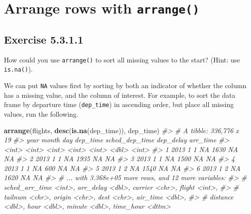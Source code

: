 \documentclass[]{book}
\newenvironment{Shaded}{\begin{snugshade}}{\end{snugshade}}
\newcommand{\CommentTok}[1]{\textcolor[rgb]{0.56,0.35,0.01}{\textit{#1}}}
\newcommand{\KeywordTok}[1]{\textcolor[rgb]{0.13,0.29,0.53}{\textbf{#1}}}
\newcommand{\NormalTok}[1]{#1}
\theoremstyle{plain}
\theoremstyle{remark}
\begin{document}
\hypertarget{arrange-rows-with-arrange}{%
\section{\texorpdfstring{Arrange rows with \texttt{arrange()}}{Arrange rows with arrange()}}\label{arrange-rows-with-arrange}}

\hypertarget{exercise-5.3.1.1}{%
\subsection*{\texorpdfstring{Exercise {5.3.1.1}}{Exercise 5.3.1.1}}\label{exercise-5.3.1.1}}

How could you use \texttt{arrange()} to sort all missing values to the start? (Hint: use \texttt{is.na()}).

We can put \texttt{NA} values first by sorting by both an indicator of whether the column has a missing value, and the column of interest.
For example, to sort the data frame by departure time (\texttt{dep\_time}) in ascending order, but place all missing values, run the following.

\begin{Shaded}
\begin{Highlighting}[]
\KeywordTok{arrange}\NormalTok{(flights, }\KeywordTok{desc}\NormalTok{(}\KeywordTok{is.na}\NormalTok{(dep_time)), dep_time)}
\CommentTok{#> # A tibble: 336,776 x 19}
\CommentTok{#>    year month   day dep_time sched_dep_time dep_delay arr_time}
\CommentTok{#>   <int> <int> <int>    <int>          <int>     <dbl>    <int>}
\CommentTok{#> 1  2013     1     1       NA           1630        NA       NA}
\CommentTok{#> 2  2013     1     1       NA           1935        NA       NA}
\CommentTok{#> 3  2013     1     1       NA           1500        NA       NA}
\CommentTok{#> 4  2013     1     1       NA            600        NA       NA}
\CommentTok{#> 5  2013     1     2       NA           1540        NA       NA}
\CommentTok{#> 6  2013     1     2       NA           1620        NA       NA}
\CommentTok{#> # ... with 3.368e+05 more rows, and 12 more variables:}
\CommentTok{#> #   sched_arr_time <int>, arr_delay <dbl>, carrier <chr>, flight <int>,}
\CommentTok{#> #   tailnum <chr>, origin <chr>, dest <chr>, air_time <dbl>,}
\CommentTok{#> #   distance <dbl>, hour <dbl>, minute <dbl>, time_hour <dttm>}
\end{Highlighting}
\end{Shaded}
\end{document}
